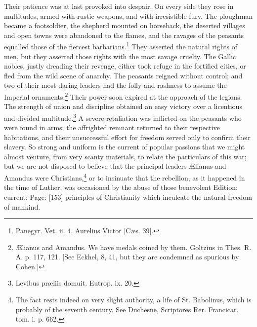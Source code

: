 Their patience was at last provoked into despair. On every side they rose in multitudes, armed with rustic weapons, and with irresistible fury. The ploughman became a footsoldier, the shepherd mounted on horseback, the deserted villages and open towns were abandoned to the flames, and the ravages of the peasants equalled those of the fiercest barbarians.\footnote{Panegyr. Vet. ii. 4. Aurelius Victor [Cæs. 39].} They asserted the natural rights of men, but they asserted those rights with the most savage cruelty. The Gallic nobles, justly dreading their revenge, either took refuge in the fortified cities, or fled from the wild scene of anarchy. The peasants reigned without control; and two of their most daring leaders had the folly and rashness to assume the Imperial ornaments.\footnote{Ælianus and Amandus. We have medals coined by them. Goltzius in Thes. R. A. p. 117, 121. [See Eckhel, 8, 41, but they are condemned as spurious by Cohen.]} Their power soon expired at the approach of the legions. The strength of union and discipline obtained an easy victory over a licentious and divided multitude.\footnote{Levibus præliis domuit. Eutrop. ix. 20.} A severe retaliation was inflicted on the peasants who were found in arms; the affrighted remnant returned to their respective habitations, and their unsuccessful effort for freedom served only to confirm their slavery. So strong and uniform is the current of popular passions that we might almost venture, from very scanty materials, to relate the particulars of this war; but we are not disposed to believe that the principal leaders Ælianus and Amandus were Christians,\footnote{The fact rests indeed on very slight authority, a life of St. Babolinus, which is probably of the seventh century. See Duchesne, Scriptores Rer. Francicar. tom. i. p. 662.} or to insinuate that the rebellion, as it happened in the time of Luther, was occasioned by the abuse of those benevolent Edition: current; Page: [153] principles of Christianity which inculcate the natural freedom of mankind.

